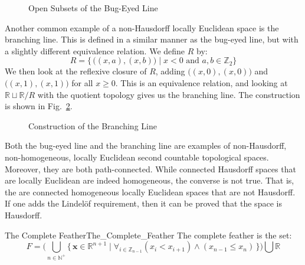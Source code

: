 \documentclass{article}                                                        %
\begin{document}
        \begin{figure}[H]
                \centering
                \captionsetup{type=figure}
                
                \caption{Open Subsets of the Bug-Eyed Line}
                \label{fig:Open_Neighborhoods_of_Origins_in_Bug_Eyed_Line}
        \end{figure}
        Another common example of a non-Hausdorff locally Euclidean space is
        the branching line. This is defined in a similar manner as the
        bug-eyed line, but with a slightly different equivalence relation.
        We define $R$ by:
        \begin{equation}
                R=\big\{\,\big((x,a),(x,b)\big)\;|\;
                    x<0\textrm{ and }a,b\in\mathbb{Z}_{2}\big\}
        \end{equation}
        We then look at the reflexive closure of $R$, adding
        $\big((x,0),(x,0)\big)$ and $\big((x,1),(x,1)\big)$ for all
        $x\geq{0}$. This is an equivalence relation, and looking at
        $\mathbb{R}\sqcup\mathbb{R}/R$ with the quotient topology gives us
        the branching line. The construction is shown in
        Fig.~\ref{fig:Construction_of_Branching_Line}.
        \begin{figure}[H]
                \centering
                \captionsetup{type=figure}
                
                \caption{Construction of the Branching Line}
                \label{fig:Construction_of_Branching_Line}
        \end{figure}
        Both the bug-eyed line and the branching line are examples of
        non-Hausdorff, non-homogeneous, locally Euclidean second countable
        topological spaces. Moreover, they are both path-connected. While
        connected Hausdorff spaces that are locally Euclidean are indeed
        homogeneous, the converse is not true. That is, the are connected
        homogeneous locally Euclidean spaces that are not Hausdorff. If one
        adds the Lindel\"{o}f requirement, then it can be proved that the
        space is Hausdorff.
        \begin{fdefinition}{The Complete Feather}{The_Complete_Feather}
                The complete feather is the set:
                \begin{equation*}
                    F=\Big(\bigcup_{n\in\mathbb{N}^{+}}
                        \big\{\,\mathbf{x}\in\mathbb{R}^{n+1}\;|\;
                            \forall_{i\in\mathbb{Z}_{n-1}}(x_{i}<x_{i+1})
                            \land(x_{n-1}\leq{x}_{n})\,\big\}\Big)
                        \bigcup\mathbb{R}
                \end{equation*}
        \end{fdefinition}
\end{document}
